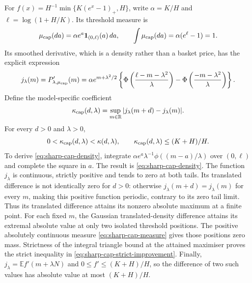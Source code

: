 For $f(x)=H^{-1}\min\{K(e^x-1)_+,H\}$, write
$\alpha=K/H$ and $\ell=\log(1+H/K)$. Its threshold measure is
\begin{equation}
 \mu_{\rm cap}(da)=\alpha e^a\mathbf1_{(0,\ell)}(a)\,da,
 \qquad\int\mu_{\rm cap}(da)=\alpha(e^\ell-1)=1.
 \label{eq:sharp-cap-measure}
\end{equation}
Its smoothed derivative, which is a density rather than a basket price,
has the explicit expression
\begin{equation}
 j_\lambda(m)=P_{\lambda,\mu_{\rm cap}}'(m)
 =\alpha e^{m+\lambda^2/2}
 \left\{\Phi\left(\frac{\ell-m-\lambda^2}{\lambda}\right)
              -\Phi\left(\frac{-m-\lambda^2}{\lambda}\right)\right\}.
 \label{eq:sharp-cap-density}
\end{equation}
Define the model-specific coefficient
\begin{equation}
 \kappa_{\rm cap}(d,\lambda)
  =\sup_{m\in\mathbb R}|j_\lambda(m+d)-j_\lambda(m)|.
 \label{eq:sharp-cap-kappa}
\end{equation}
For every $d>0$ and $\lambda>0$,
\begin{equation}
 0<\kappa_{\rm cap}(d,\lambda)
   <\kappa(d,\lambda),\qquad
 \kappa_{\rm cap}(d,\lambda)\leq(K+H)/H.
 \label{eq:sharp-cap-strict-improvement}
\end{equation}
To derive \eqref{eq:sharp-cap-density}, integrate
$\alpha e^a\lambda^{-1}\phi((m-a)/\lambda)$ over $(0,\ell)$
and complete the square in $a$. The result is
\eqref{eq:sharp-cap-density}. The function $j_\lambda$ is continuous,
strictly positive and tends to zero at both tails. Its translated
difference is not identically zero for $d>0$: otherwise
$j_\lambda(m+d)=j_\lambda(m)$ for every $m$, making this positive
function periodic, contrary to its zero tail limit. Thus its translated
difference attains its nonzero absolute maximum at a finite point.
For each fixed $m$, the Gaussian translated-density difference attains
its extremal absolute value at only two isolated threshold positions.
The positive absolutely continuous measure \eqref{eq:sharp-cap-measure}
gives those positions zero mass. Strictness of the integral triangle
bound at the attained maximiser proves the strict inequality in
\eqref{eq:sharp-cap-strict-improvement}. Finally,
$j_\lambda=\mathbb E f'(m+\lambda N)$ and
$0\leq f'\leq(K+H)/H$, so the difference of two such values has
absolute value at most $(K+H)/H$.

